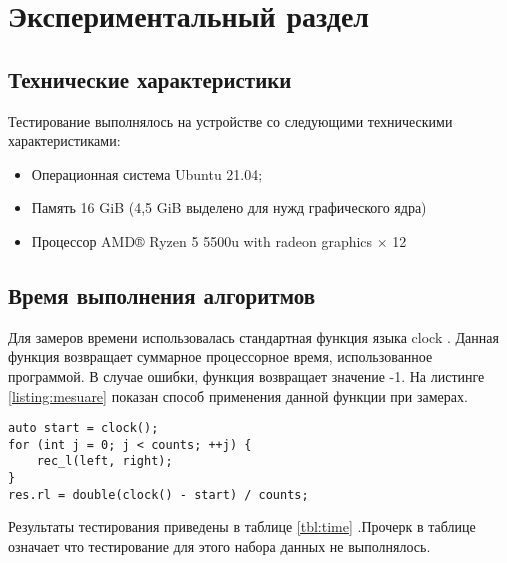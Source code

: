 \chapter{Экспериментальный раздел}
\label{cha:research}

\section{Технические характеристики}
Тестирование выполнялось на устройстве со следующими техническими характеристиками:
\begin{itemize}
	\item Операционная система Ubuntu 21.04;
	\item Память 16 GiB (4,5 GiB выделено для нужд графического ядра)
	\item Процессор AMD® Ryzen 5 5500u with radeon graphics × 12 
\end{itemize}

\section{Время выполнения алгоритмов}

Для замеров времени использовалась стандартная функция языка clock \cite{clock}.  Данная функция возвращает суммарное процессорное время, использованное программой. В случае ошибки, функция возвращает значение -1. На листинге \ref{listing:mesuare} показан способ применения данной функции при замерах.

\begin{lstlisting}[caption={Замер времени функции}, label=listing:mesuare]
auto start = clock();
for (int j = 0; j < counts; ++j) {
    rec_l(left, right);
}
res.rl = double(clock() - start) / counts;
\end{lstlisting}


Результаты тестирования приведены в таблице \ref{tbl:time} .Прочерк в таблице означает что тестирование для этого набора данных не выполнялось.

